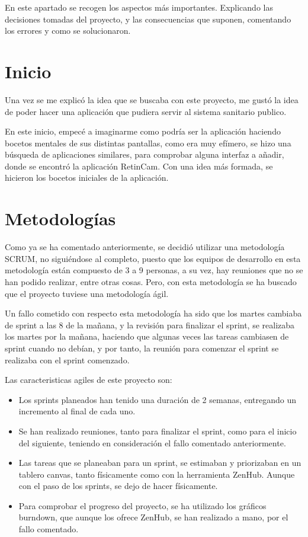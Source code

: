 
En este apartado se recogen los aspectos más importantes. Explicando las decisiones tomadas del proyecto, y las consecuencias que suponen, comentando los errores y como se solucionaron.

\section{Inicio}

Una vez se me explicó la idea que se buscaba con este proyecto, me gustó la idea de poder hacer una aplicación que pudiera servir al sistema sanitario publico.

En este inicio, empecé a imaginarme como podría ser la aplicación haciendo bocetos mentales de sus distintas pantallas, como era muy efímero, se hizo una búsqueda de aplicaciones similares, para comprobar alguna interfaz a añadir, donde se encontró la aplicación RetinCam. Con una idea más formada, se hicieron los bocetos iniciales de la aplicación.

\section{Metodologías}

Como ya se ha comentado anteriormente, se decidió utilizar una metodología SCRUM, no siguiéndose al completo, puesto que los equipos de desarrollo en esta metodología están compuesto de 3 a 9 personas, a su vez, hay reuniones que no se han podido realizar, entre otras cosas. Pero, con esta metodología se ha buscado que el proyecto tuviese una metodología ágil.

Un fallo cometido con respecto esta metodología ha sido que los martes cambiaba de sprint a las 8 de la mañana, y la revisión para finalizar el sprint, se realizaba los martes por la mañana, haciendo que algunas veces las tareas cambiasen de sprint cuando no debían, y por tanto, la reunión para comenzar el sprint se realizaba con el sprint comenzado.

Las caracteristicas agiles de este proyecto son:
\begin{itemize}
    \item Los sprints planeados han tenido una duración de 2 semanas, entregando un incremento al final de cada uno.
    \item Se han realizado reuniones, tanto para finalizar el sprint, como para el inicio del siguiente, teniendo en consideración el fallo comentado anteriormente.
    \item Las tareas que se planeaban para un sprint, se estimaban y priorizaban en un tablero canvas, tanto físicamente como con la herramienta ZenHub. Aunque con el paso de los sprints, se dejo de hacer físicamente.
    \item Para comprobar el progreso del proyecto, se ha utilizado los gráficos burndown, que aunque los ofrece ZenHub, se han realizado a mano, por el fallo comentado.
\end{itemize}

